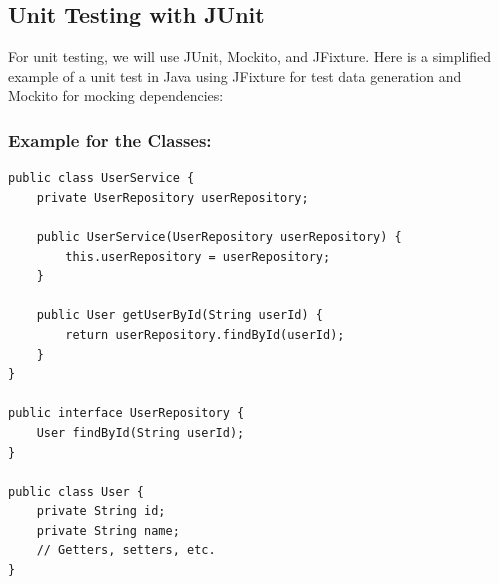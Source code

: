 \documentclass{article}
\begin{document}
\subsection{Unit Testing with JUnit}

For unit testing, we will use JUnit, Mockito, and JFixture. Here is a simplified example of a unit test in Java using JFixture for test data generation and Mockito for mocking dependencies:

\subsubsection*{Example for the Classes:}
\begin{verbatim}
public class UserService {
    private UserRepository userRepository;

    public UserService(UserRepository userRepository) {
        this.userRepository = userRepository;
    }

    public User getUserById(String userId) {
        return userRepository.findById(userId);
    }
}

public interface UserRepository {
    User findById(String userId);
}

public class User {
    private String id;
    private String name;
    // Getters, setters, etc.
}
\end{verbatim}
\end{document}
